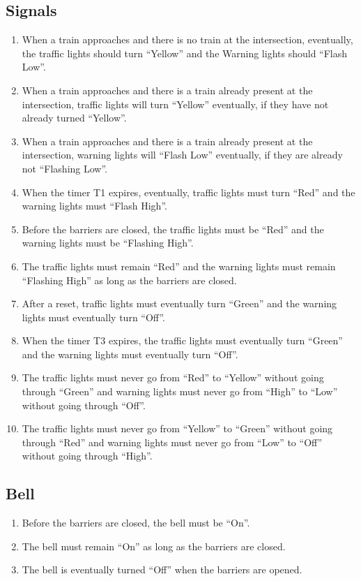 \documentclass[10pt,a4paper]{article}
\begin{document}
\subsection{Signals}
\begin{enumerate}[resume]
\item When a train approaches and there is no train at the intersection, eventually, the traffic lights should turn ``Yellow'' and the Warning lights should ``Flash Low''.
\item When a train approaches and there is a train already present at the intersection, traffic lights will turn ``Yellow'' eventually, if they have not already turned ``Yellow''.
\item When a train approaches and there is a train already present at the intersection, warning lights will ``Flash Low'' eventually, if they are already not ``Flashing Low''.
\item When the timer T1 expires, eventually, traffic lights must turn ``Red'' and the warning lights must ``Flash High''.
\item Before the barriers are closed, the traffic lights must be ``Red'' and the warning lights must be ``Flashing High''.
\item The traffic lights must remain ``Red'' and the warning lights must remain ``Flashing High'' as long as the barriers are closed.
\item After a reset, traffic lights must eventually turn ``Green'' and the warning lights must eventually turn ``Off''.
\item When the timer T3 expires, the traffic lights must eventually turn ``Green'' and the warning lights must eventually turn ``Off''.
\item The traffic lights must never go from ``Red'' to ``Yellow'' without going through ``Green'' and warning lights must never go from ``High'' to ``Low'' without going through ``Off''.
\item The traffic lights must never go from ``Yellow'' to ``Green'' without going through ``Red'' and warning lights must never go from ``Low'' to ``Off'' without going through ``High''.
\end{enumerate}

\subsection{Bell}
\begin{enumerate}[resume]
\item Before the barriers are closed, the bell must be ``On''.
\item The bell must remain ``On'' as long as the barriers are closed.
\item The bell is eventually turned ``Off'' when the barriers are opened.
\end{enumerate}
\end{document}
